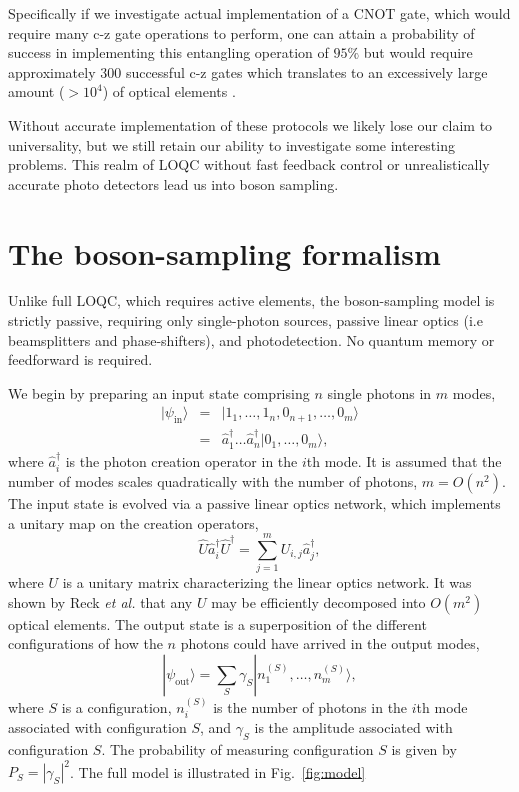 \documentclass[aps,pra,twocolumn,amsmath,amssymb,nofootinbib,superscriptaddress]{revtex4}
\newcommand{\ket}[1]{|#1\rangle}
\begin{document}
Specifically if we investigate actual implementation of a CNOT gate, which would require many c-z gate operations to perform, one can attain a probability of success in implementing this entangling operation of $95\%$ but would require approximately 300 successful c-z gates which translates to an excessively large amount ($>10^4$) of optical elements \cite{nielsen2}.

Without accurate implementation of these protocols we likely lose our claim to universality, but we still retain our ability to investigate some interesting problems. This realm of LOQC without fast feedback control or unrealistically accurate photo detectors lead us into boson sampling.

\section{The boson-sampling formalism}

Unlike full LOQC, which requires active elements, the boson-sampling model is strictly passive, requiring only single-photon sources, passive linear optics (i.e beamsplitters and phase-shifters), and photodetection. No quantum memory or feedforward is required.

We begin by preparing an input state comprising $n$ single photons in $m$ modes,
\begin{eqnarray} \label{eq:input_state}
\ket{\psi_\mathrm{in}} &=& \ket{1_1,\dots,1_n,0_{n+1},\dots,0_m} \nonumber \\
&=& \hat{a}^\dag_1 \dots \hat{a}^\dag_n \ket{0_1,\dots,0_m},
\end{eqnarray}
where $\hat{a}^\dag_i$ is the photon creation operator in the $i$th mode. It is assumed that the number of modes scales quadratically with the number of photons, \mbox{$m=O(n^2)$}. The input state is evolved via a passive linear optics network, which implements a unitary map on the creation operators,
\begin{equation} \label{eq:Utransform}
\hat{U}\hat{a}_i^\dag\hat{U}^\dag = \sum_{j=1}^m U_{i,j} \hat{a}_j^\dag,
\end{equation} 
where $U$ is a unitary matrix characterizing the linear optics network. It was shown by Reck \emph{et al.} \cite{bib:Reck94} that any $U$ may be efficiently decomposed into $O(m^2)$ optical elements. The output state is a superposition of the different configurations of how the $n$ photons could have arrived in the output modes,
\begin{equation}
\ket{\psi_\mathrm{out}} = \sum_S \gamma_S \ket{n_1^{(S)},\dots,n_m^{(S)}},
\end{equation}
where $S$ is a configuration, $n_i^{(S)}$ is the number of photons in the $i$th mode associated with configuration $S$, and $\gamma_S$ is the amplitude associated with configuration $S$. The probability of measuring configuration $S$ is given by \mbox{$P_S = |\gamma_S|^2$}. The full model is illustrated in Fig.~\ref{fig:model}
\end{document}
